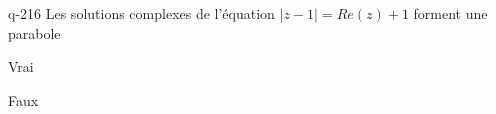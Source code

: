 \begin{truefalse}{q-216}
Les solutions complexes de l'équation $|z-1|=Re(z)+1$ forment une parabole
\item* Vrai
\item Faux
\end{truefalse}

